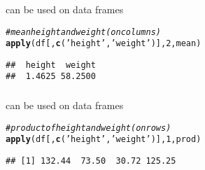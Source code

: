 \documentclass[12pt]{beamer}\usepackage[]{graphicx}\usepackage[]{color}
\makeatletter
\newcommand{\hlnum}[1]{\textcolor[rgb]{0.686,0.059,0.569}{#1}}%
\newcommand{\hlstr}[1]{\textcolor[rgb]{0.192,0.494,0.8}{#1}}%
\newcommand{\hlcom}[1]{\textcolor[rgb]{0.678,0.584,0.686}{\textit{#1}}}%
\newcommand{\hlstd}[1]{\textcolor[rgb]{0.345,0.345,0.345}{#1}}%
\newcommand{\hlkwd}[1]{\textcolor[rgb]{0.737,0.353,0.396}{\textbf{#1}}}%
\newenvironment{kframe}{%
 \def\at@end@of@kframe{}%
 \ifinner\ifhmode%
  \def\at@end@of@kframe{\end{minipage}}%
  \begin{minipage}{\columnwidth}%
 \fi\fi%
 \def\FrameCommand##1{\hskip\@totalleftmargin \hskip-\fboxsep
 \colorbox{shadecolor}{##1}\hskip-\fboxsep
     \hskip-\linewidth \hskip-\@totalleftmargin \hskip\columnwidth}%
 \MakeFramed {\advance\hsize-\width
   \@totalleftmargin\z@ \linewidth\hsize
   \@setminipage}}%
 {\par\unskip\endMakeFramed%
 \at@end@of@kframe}
\newenvironment{knitrout}{}{} %
\makeatother
\begin{document}

\begin{frame}[fragile]
\frametitle{}

 can be used on data frames
\begin{knitrout}\footnotesize
{}\color{fgcolor}\begin{kframe}
\begin{alltt}
\hlcom{# mean height and weight (on columns)}
\hlkwd{apply}\hlstd{(df[ ,}\hlkwd{c}\hlstd{(}\hlstr{'height'}\hlstd{,} \hlstr{'weight'}\hlstd{)],} \hlnum{2}\hlstd{, mean)}
\end{alltt}
\begin{verbatim}
##  height  weight 
##  1.4625 58.2500
\end{verbatim}
\end{kframe}
\end{knitrout}

\end{frame}


\begin{frame}[fragile]
\frametitle{}

 can be used on data frames
\begin{knitrout}\footnotesize
{}\color{fgcolor}\begin{kframe}
\begin{alltt}
\hlcom{# product of height and weight (on rows)}
\hlkwd{apply}\hlstd{(df[ ,}\hlkwd{c}\hlstd{(}\hlstr{'height'}\hlstd{,} \hlstr{'weight'}\hlstd{)],} \hlnum{1}\hlstd{, prod)}
\end{alltt}
\begin{verbatim}
## [1] 132.44  73.50  30.72 125.25
\end{verbatim}
\end{kframe}
\end{knitrout}

\end{frame}


\begin{frame}
\begin{center}
\Huge{}
\end{center}
\end{frame}
\end{document}
